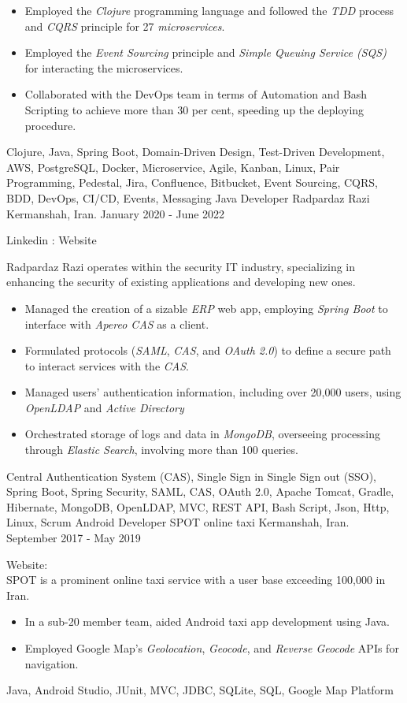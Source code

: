 \begin{experiences}
{\begin{itemize}
   \item Employed the \emph{Clojure} programming language and followed the \emph{TDD} process and \textit{CQRS} principle for 27 \emph{microservices}.
   \item Employed the \textit{Event Sourcing} principle and \textit{Simple Queuing Service (SQS)} for interacting the microservices.
   \item Collaborated with the DevOps team in terms of Automation and Bash Scripting to achieve more than 30 per cent, speeding up the deploying procedure.
   \end{itemize}}{Clojure, Java, Spring Boot, Domain-Driven Design, Test-Driven Development, AWS, PostgreSQL, Docker, Microservice, Agile, Kanban, Linux, Pair Programming, Pedestal, Jira, Confluence, Bitbucket, Event Sourcing, CQRS, BDD, DevOps, CI/CD, Events, Messaging}
  \emptySeparator
\experience
{}
{Java Developer}
{Radpardaz Razi}
{Kermanshah, Iran. \hspace{170 pt} January 2020 - June 2022}
{}
{
Linkedin : 
Website 
\par{Radpardaz Razi operates within the security IT industry, specializing in enhancing the security of existing applications and developing new ones.}
\begin{itemize}
\item Managed the creation of a sizable \emph{ERP} web app, employing \emph{Spring Boot} to interface with \emph{Apereo CAS} as a client.
\item Formulated protocols (\emph{SAML}, \emph{CAS}, and \emph{OAuth 2.0}) to define a secure path to interact services with the \textit{CAS}.
\item Managed users' authentication information, including over 20,000 users, using \emph{OpenLDAP} and \emph{Active Directory}
\item Orchestrated storage of logs and data in \emph{MongoDB}, overseeing processing through \emph{Elastic Search}, involving more than 100 queries.
\end{itemize}
}{Central Authentication System (CAS), Single Sign in Single Sign out (SSO), Spring Boot, Spring Security, SAML, CAS, OAuth 2.0, Apache Tomcat, Gradle, Hibernate, MongoDB, OpenLDAP, MVC, REST API, Bash Script, Json, Http, Linux, Scrum}
\emptySeparator
\experience
  {}
  {Android Developer}
  {SPOT online taxi}
  {Kermanshah, Iran. \hspace{140 pt} September 2017 - May 2019}
  {}
  {
  Website: \\
  SPOT is a prominent online taxi service with a user base exceeding 100,000 in Iran. 
  \begin{itemize}
    \item In a sub-20 member team, aided Android taxi app development using Java.
    \item Employed Google Map's \emph{Geolocation}, \emph{Geocode}, and \emph{Reverse Geocode} APIs for navigation.\end{itemize}
  }{Java, Android Studio, JUnit, MVC, JDBC, SQLite, SQL, Google Map Platform}


\end{experiences}

